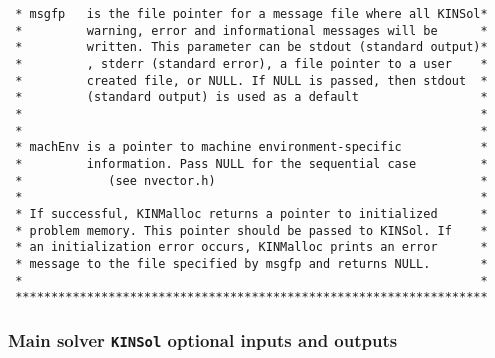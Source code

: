 \documentclass[11pt]{article}
\begin{document}
\begin{verbatim}
 * msgfp   is the file pointer for a message file where all KINSol*
 *         warning, error and informational messages will be      *
 *         written. This parameter can be stdout (standard output)*
 *         , stderr (standard error), a file pointer to a user    *
 *         created file, or NULL. If NULL is passed, then stdout  *
 *         (standard output) is used as a default                 *
 *                                                                *
 *                                                                *
 * machEnv is a pointer to machine environment-specific           *
 *         information. Pass NULL for the sequential case         *
 *            (see nvector.h)                                     *
 *                                                                *
 * If successful, KINMalloc returns a pointer to initialized      *
 * problem memory. This pointer should be passed to KINSol. If    *
 * an initialization error occurs, KINMalloc prints an error      *
 * message to the file specified by msgfp and returns NULL.       *
 *                                                                *
 ******************************************************************

\end{verbatim}
\normalsize

\subsubsection{Main solver {\tt KINSol} optional inputs and outputs}
\end{document}
